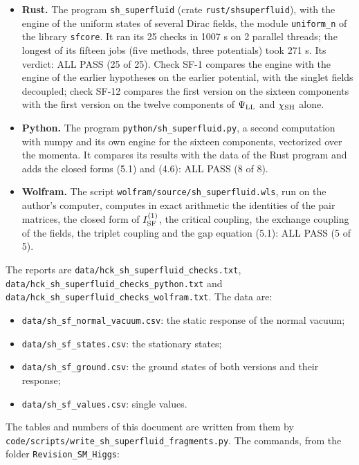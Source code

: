 \documentclass[
  10pt,
]{article}
\providecommand{\tightlist}{%
  \setlength{\itemsep}{0pt}\setlength{\parskip}{0pt}}
\begin{document}
\begin{itemize}
\tightlist
\item
  \textbf{Rust.} The program \texttt{sh\_superfluid} (crate
  \texttt{rust/shsuperfluid}), with the engine of the uniform states of
  several Dirac fields, the module \texttt{uniform\_n} of the library
  \texttt{sfcore}. It ran its 25 checks in 1007 s on 2 parallel threads;
  the longest of its fifteen jobs (five methods, three potentials) took
  271 s. Its verdict: ALL PASS (25 of 25). Check SF-1 compares the
  engine with the engine of the earlier hypotheses on the earlier
  potential, with the singlet fields decoupled; check SF-12 compares the
  first version on the sixteen components with the first version on the
  twelve components of \(\Psi_{\rm LL}\) and \(\chi_{\rm SH}\) alone.
\item
  \textbf{Python.} The program \texttt{python/sh\_superfluid.py}, a
  second computation with numpy and its own engine for the sixteen
  components, vectorized over the momenta. It compares its results with
  the data of the Rust program and adds the closed forms (5.1) and
  (4.6): ALL PASS (8 of 8).
\item
  \textbf{Wolfram.} The script
  \texttt{wolfram/source/sh\_superfluid.wls}, run on the author's
  computer, computes in exact arithmetic the identities of the pair
  matrices, the closed form of \(I^{(1)}_{\rm SF}\), the critical
  coupling, the exchange coupling of the fields, the triplet coupling
  and the gap equation (5.1): ALL PASS (5 of 5).
\end{itemize}

The reports are \texttt{data/hck\_sh\_superfluid\_checks.txt},
\texttt{data/hck\_sh\_superfluid\_checks\_python.txt} and
\texttt{data/hck\_sh\_superfluid\_checks\_wolfram.txt}. The data are:

\begin{itemize}
\tightlist
\item
  \texttt{data/sh\_sf\_normal\_vacuum.csv}: the static response of the
  normal vacuum;
\item
  \texttt{data/sh\_sf\_states.csv}: the stationary states;
\item
  \texttt{data/sh\_sf\_ground.csv}: the ground states of both versions
  and their response;
\item
  \texttt{data/sh\_sf\_values.csv}: single values.
\end{itemize}

The tables and numbers of this document are written from them by
\texttt{code/scripts/write\_sh\_superfluid\_fragments.py}. The commands,
from the folder \texttt{Revision\_SM\_Higgs}:
\end{document}
